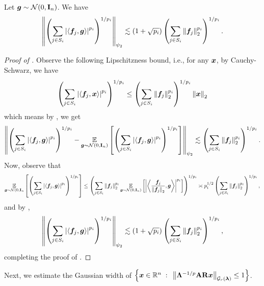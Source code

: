 \documentclass[11pt]{article}
\numberwithin{equation}{section}
\begin{document}
\begin{lemma}
\label{lemma:one_group_subgaussian}
Let $\vg \sim \cN(0,\mI_n)$. We have
\begin{align*}
    \subgnorm{\inparen{\sum_{j \in S_i} \abs{\ip{\vf_j,\vg}}^{p_i}}^{1/p_i}} \lesssim \inparen{1+\sqrt{p_i}}\inparen{\sum_{j \in S_i} \norm{\vf_j}_{2}^{p_i}}^{1/p_i}.
\end{align*}
\end{lemma}
\begin{proof}[Proof of ]
Observe the following Lipschitzness bound, i.e., for any $\vx$, by Cauchy-Schwarz, we have
\begin{align*}
   \inparen{\sum_{j \in S_i} \abs{\ip{\vf_j,\vx}}^{p_i}}^{1/p_i} \le \inparen{\sum_{j \in S_i} \norm{\vf_j}_{2}^{p_i}}^{1/p_i}\norm{\vx}_2
\end{align*}
which means by , we get
\begin{align*}
    \subgnorm{\inparen{\sum_{j \in S_i} \abs{\ip{\vf_j,\vg}}^{p_i}}^{1/p_i}-\exvv{\vg\sim\cN(0,\mI_n)}{\inparen{\sum_{j \in S_i} \abs{\ip{\vf_j,\vg}}^{p_i}}^{1/p_i}}} \lesssim \inparen{\sum_{j \in S_i} \norm{\vf_j}_{2}^{p_i}}^{1/p_i}.
\end{align*}
Now, observe that
\begin{align*}
    \exvv{\vg\sim\cN(0,\mI_n}{\inparen{\sum_{j \in S_i} \abs{\ip{\vf_j,\vg}}^{p_i}}^{1/p_i}} \le \inparen{\sum_{j \in S_i} \norm{\vf_j}_2^{p_i}\exvv{\vg\sim\cN(0,\mI_n)}{\abs{\ip{\frac{\vf_j}{\norm{\vf_j}_2},\vg}}^{p_i}}}^{1/p_i} \asymp p_i^{1/2}\inparen{\sum_{j \in S_i} \norm{\vf_j}_{2}^{p_i}}^{1/p_i},
\end{align*}
and by ,
\begin{align*}
    \subgnorm{\inparen{\sum_{j \in S_i} \abs{\ip{\vf_j,\vg}}^{p_i}}^{1/p_i}} \lesssim \inparen{1+\sqrt{p_i}}\inparen{\sum_{j \in S_i} \norm{\vf_j}_{2}^{p_i}}^{1/p_i},
\end{align*}
completing the proof of .
\end{proof}

Next, we estimate the Gaussian width of $\inbraces{\vx\in\R^n\suchthat \gnorml{\mLambda^{-1/p}\mA\mR\vx}{r} \le 1}$.
\end{document}
